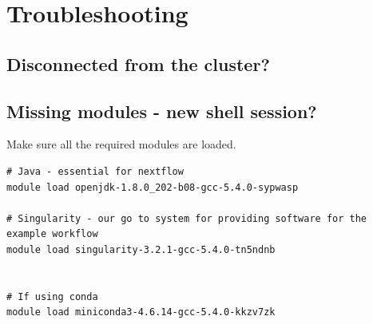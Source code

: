 \section{Troubleshooting}

\subsection{Disconnected from the cluster?}  

\subsection{Missing modules - new shell session?}



Make sure all the required modules are loaded. 

\begin{steps}
\begin{lstlisting}
# Java - essential for nextflow
module load openjdk-1.8.0_202-b08-gcc-5.4.0-sypwasp 

# Singularity - our go to system for providing software for the example workflow
module load singularity-3.2.1-gcc-5.4.0-tn5ndnb


# If using conda 
module load miniconda3-4.6.14-gcc-5.4.0-kkzv7zk
\end{lstlisting}
\end{steps}




